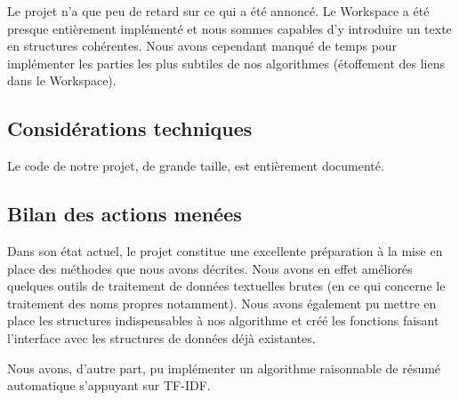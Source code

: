 \documentclass[a4paper, 12pt]{article}
\begin{document}
Le projet n'a que peu de retard sur ce qui a été annoncé. Le Workspace a été presque entièrement implémenté et nous sommes capables d'y introduire un texte en structures cohérentes. Nous avons cependant manqué de temps pour implémenter les parties les plus subtiles de nos algorithmes (étoffement des liens dans le Workspace).

\subsection{Considérations techniques}

Le code de notre projet, de grande taille, est entièrement documenté.

\subsection{Bilan des actions menées}

Dans son état actuel, le projet constitue une excellente préparation à la mise en place des méthodes que nous avons décrites. Nous avons en effet améliorés quelques outils de traitement de données textuelles brutes (en ce qui concerne le traitement des noms propres notamment). Nous avons également pu mettre en place les structures indispensables à nos algorithme et créé les fonctions faisant l'interface avec les structures de données déjà existantes.

Nous avons, d'autre part, pu implémenter un algorithme raisonnable de résumé automatique s'appuyant sur TF-IDF. %



\vspace{1\baselineskip}



\end{document}

